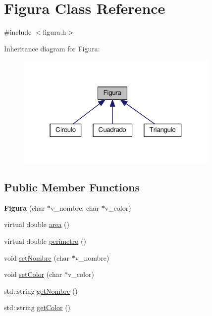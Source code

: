 \hypertarget{classFigura}{}\section{Figura Class Reference}
\label{classFigura}


{\ttfamily \#include $<$figura.\+h$>$}



Inheritance diagram for Figura\+:
\nopagebreak
\begin{figure}[H]
\begin{center}
\leavevmode
\includegraphics[width=279pt]{classFigura__inherit__graph}
\end{center}
\end{figure}
\subsection*{Public Member Functions}
\begin{DoxyCompactItemize}
\item 
{\bfseries Figura} (char $\ast$v\+\_\+nombre, char $\ast$v\+\_\+color)\hypertarget{classFigura_a11d2d8d29aee9f74b813df7abdbb4971}{}\label{classFigura_a11d2d8d29aee9f74b813df7abdbb4971}

\item 
virtual double \hyperlink{classFigura_ade6b12995c86cb72e37738668d77963d}{area} ()
\item 
virtual double \hyperlink{classFigura_a7451dfc1da3533fa15205df11afe7ac3}{perimetro} ()
\item 
void \hyperlink{classFigura_a1a66a42a0eed6dcacfb410d970780fa5}{set\+Nombre} (char $\ast$v\+\_\+nombre)
\item 
void \hyperlink{classFigura_ac593544158f072cf57835892cc35096e}{set\+Color} (char $\ast$v\+\_\+color)
\item 
std\+::string \hyperlink{classFigura_ad33b005e0206b70251e652f53796d586}{get\+Nombre} ()
\item 
std\+::string \hyperlink{classFigura_a940226fafa4e275b6a48dcff09fb5927}{get\+Color} ()
\end{DoxyCompactItemize}
